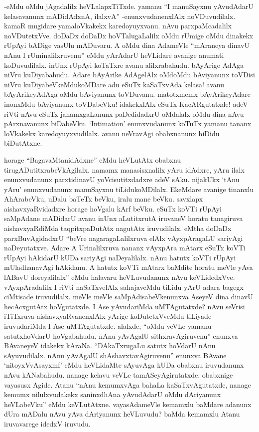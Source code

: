 -eMdu oMdu jAgadalilx heVLalapxTiTxde. yamanu ``I manuSayxnu yAvudAdarU kelasavanunx mADidAdxnA, ilalxvA'' -enunxvudanenxlAlx noVDuvudilalx. kamaR mugidare yamaloVkakekx karedoyuyxvanu. nAvu parxpaMcadalilx noVDutetxVve. doDaDx doDaDx hoVTalugaLalilx oMdu rUmige oMdu dinakekx {} rUpAyi bADige vasUlu mADuvaru. A oMdu dina AdameVle ``mAraneya dinavU nAnu I rUminalilxruvenu'' eMdu yArAdarU heVLidare avanige anumati koDuvudilalx. inUnx {} rUpAyi koTaTxre avanu alilxrabahudu. bAyArige AdAga niVru kuDiyabahudu. Adare bAyArike AdAgelAlx oMdoMdu bAviyanunx toVDisi niVru kuDiyabeVkeMdukoMDare adu eSuTx kaSaTxvAda kelasa! avanu bAyArikeyAdAga oMdu bAviyanunx toVDuvanu. matotxmemx bAyArikeyAdare inonxMdu bAviyanunx toVDabeVku! idakekxlAlx eSuTx KacARgutatxde! adeV riVti nAvu eSuTx janamxgaLanunx paDedidadxrU oMdalalx oMdu dina nAvu pArxnavanunx biDabeVku. `{\eng Intimation}' enunxvudanunx koTuTx yamanu tananx loVkakekx karedoyuyxvudilalx. avanu neVravAgi obabxnanunx hiDidu biDutAtxne.

horage ``BagavaMtanidAdxne'' eMdu heVLutAtx obabxnu tirugADutitxrabeVkAgilalx. namamx manasisxnalilx yAru idAdxre, yAru ilalx enunxvudanunx parxtidinavU yoVcisutitxdadxre adeV sAku. nijakUkx `tAnu yAru' enunxvudanunx manuSayxnu tiLidukoMDilalx. EkeMdare avanige tinanxlu AhArabeVku, uDalu baTeTx beVku, iralu mane beVku. savxlapx aishavxyaRvidadxre horage hoVgalu kArf beVku. eSuTx koVTi rUpAyi saMpAdane mADidarU avanu inUnx aLutitxrutA iruvaneV horatu tanagiruva aishavxyaRdiMda taqpitxpaDutAtx nagutAtx iruvudilalx. eMtha doDaDx parxBuvAgidadxrU ``beVre nagaragaLalilxruva elAlx vAyxpAragaLU sariyAgi naDeyutatxve. Adare A Urinalilxruva nananx vAyxpAra mAtarx eSuTx koVTi rUpAyi hAkidarU kUDa sariyAgi naDeyalilalx. nAnu hatutx koVTi rUpAyi mUladhanavAgi hAkidanu. A hatutx koVTi mAtarx baMdite horatu meVle yAva lABavU doreyalilalx'' eMdu halavaru heVLuvudanunx nAvu keVLidedxVve. vAyxpAradalilx I riVti naSaTxvelAlx sahajaveMdu tiLidu yArU adara bagegx ciMtisade iruvudilalx. meVle meVle saMpAdisabeVkenunxva AseyeV dina dinavU hecAcxgutAtx hoVgutatxde. I Ase yAvudariMda uMTAgutatxde? nAvu seVrisi iTiTxruva aishavxyaRvanenxlAlx yArige koDutetxVveMdu tiLiyade iruvudariMda I Ase uMTAgutatxde. alalxde, ``oMdu veVLe yamanu satutxhoVdarU hoVgabahudu. nAnu yAvAgalU sithxravAgiruvenu'' enunxva BAvaneyeV idakekx kAraNa. ``DAkaTxrugaLu satutx hoVdarU nAnu sAyuvudilalx. nAnu yAvAgalU shAshavxtavAgiruvenu'' enunxva BAvane `nitoyxVvAsayxmf' eMdu heVLidaMte sAyuvAga kUDa obabxnu iruvudanunx nAvu kANabahudu. nanage kelavu veVLe tamASeyAgirutatxde. obabxnige {} vayasusx Agide. Atanu ``nAnu kemumxvAga bahaLa kaSaTxvAgutatxde, nanage kemumx nilulxvudakekx saninxdhAna yAvudAdarU oMdu dAriyanunx heVLabeVku'' eMdu keVLutAtxne. {} vayasAdameVle kemamxlu baMdare adanunx dUra mADalu nAvu yAva dAriyanunx heVLuvudu? baMda kemamxlu Atanu iruvavarege idedxV iruvudu.

